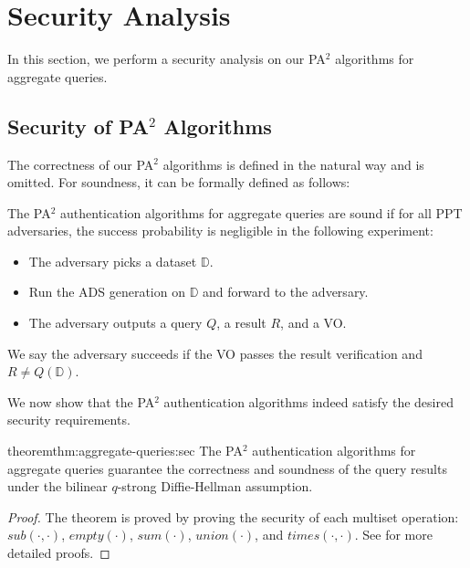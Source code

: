 \section{Security Analysis}\label{sec:aggregate-queries:security-analysis}

In this section, we perform a security analysis on our PA$^2$ algorithms for aggregate queries.

\subsection{Security of PA$^2$ Algorithms}

The correctness of our PA$^2$ algorithms is defined in the natural way and is omitted. For soundness, it can be formally defined as follows:

\begin{definition}[Soundness]\label{def:aggregate-queries:sound}
  The PA$^2$ authentication algorithms for aggregate queries are sound if for all PPT adversaries, the success probability is negligible in the following experiment:
  \begin{itemize}
    \item The adversary picks a dataset $\mathbb{D}$.
    \item Run the ADS generation on $\mathbb{D}$ and forward to the adversary.
    \item The adversary outputs a query $Q$, a result $R$, and a VO\@.
  \end{itemize}
  We say the adversary succeeds if the VO passes the result verification and $ R \neq Q(\mathbb{D})$.
\end{definition}

We now show that the PA$^2$ authentication algorithms indeed satisfy the desired security requirements.

\begin{restatable}{theorem}{thm:aggregate-queries:sec}
  The PA$^2$ authentication algorithms for aggregate queries guarantee the correctness and soundness of the query results under the bilinear $q$-strong Diffie-Hellman assumption.
\end{restatable}

\begin{proof}
  The theorem is proved by proving the security of each multiset operation: $sub(\cdot,\cdot)$, $empty(\cdot)$, $sum(\cdot)$, $union(\cdot)$, and $times(\cdot,\cdot)$. See  for more detailed proofs.
\end{proof}

